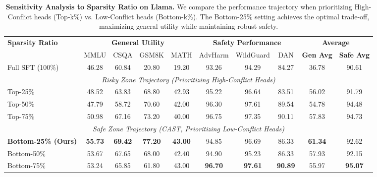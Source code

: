 \begin{table}[t]
\centering
\small
\setlength{\tabcolsep}{4pt}
\begin{tabular}{l|cccc|ccc|cc}
\toprule
\multirow{2}{*}{\textbf{Sparsity Ratio}} & \multicolumn{4}{c|}{\textbf{General Utility}} & \multicolumn{3}{c|}{\textbf{Safety Performance}} & \multicolumn{2}{c}{\textbf{Average}} \\
\cmidrule(lr){2-5} \cmidrule(lr){6-8} \cmidrule(lr){9-10}
& MMLU & CSQA & GSM8K & MATH & AdvHarm & WildGuard & DAN & \textbf{Gen Avg} & \textbf{Safe Avg} \\
\midrule
Full SFT (100\%) & 46.28 & 60.84 & 20.80 & 19.20 & 93.26 & 94.29 & 84.27 & 36.78 & 90.61 \\
\midrule
\multicolumn{10}{c}{\textit{Risky Zone Trajectory (Prioritizing High-Conflict Heads)}} \\
\midrule
Top-25\% & 48.52 & 63.83 & 68.80 & 42.93 & 95.22 & 96.64 & 83.51 & 56.02 & 91.79 \\
Top-50\% & 47.79 & 58.72 & 70.60 & 42.00 & 96.30 & 97.61 & 89.54 & 54.78 & 94.48 \\
Top-75\% & 50.98 & 67.16 & 73.20 & 40.00 & 96.75 & 97.35 & 90.11 & 57.83 & 94.73 \\
\midrule
\multicolumn{10}{c}{\textit{Safe Zone Trajectory (CAST, Prioritizing Low-Conflict Heads)}} \\
\midrule
\textbf{Bottom-25\% (Ours)} & \textbf{55.73} & \textbf{69.42} & \textbf{77.20} & \textbf{43.00} & 94.85 & 96.69 & 86.33 & \textbf{61.34} & 92.62 \\
Bottom-50\% & 53.67 & 67.65 & 68.00 & 42.40 & 94.90 & 95.23 & 86.33 & 57.93 & 92.15 \\
Bottom-75\% & 53.24 & 65.85 & 61.80 & 43.00 & \textbf{96.70} & \textbf{97.61} & \textbf{90.89} & 55.97 & \textbf{95.07} \\
\bottomrule
\end{tabular}
\caption{\textbf{Sensitivity Analysis to Sparsity Ratio on Llama.} We compare the performance trajectory when prioritizing High-Conflict heads (Top-k\%) vs. Low-Conflict heads (Bottom-k\%). The Bottom-25\% setting achieves the optimal trade-off, maximizing general utility while maintaining robust safety.}
\label{tab:sparsity_ablation}
\end{table}